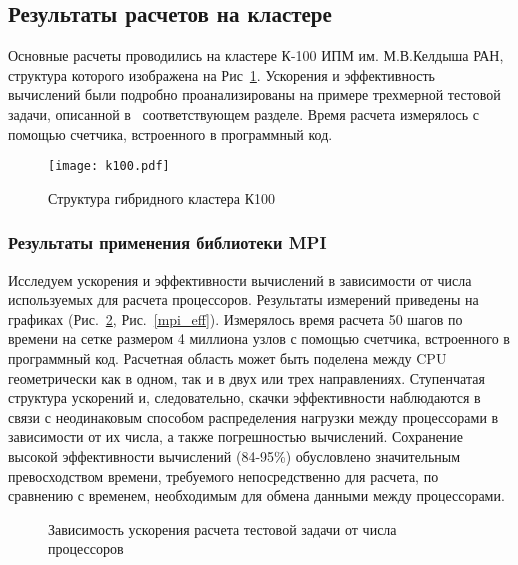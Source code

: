 \subsection{Результаты расчетов на кластере}

Основные расчеты проводились на кластере К-100 ИПМ им. М.В.Келдыша РАН, 
структура которого изображена на Рис~\ref{pic_k100}.
Ускорения и эффективность вычислений
были подробно проанализированы на примере трехмерной тестовой задачи, описанной в~ соответствующем
разделе. Время расчета измерялось с помощью счетчика, встроенного в программный код.

\begin{figure}[!h]\center
\texttt{[image: k100.pdf]} 
\caption{Структура гибридного кластера К100}
\label{pic_k100}
\end{figure}

\subsubsection{Результаты применения библиотеки MPI}

Исследуем ускорения и эффективности вычислений в зависимости от числа
используемых для расчета процессоров. Результаты измерений приведены
на графиках (Рис.~\ref{mpi_speedup}, Рис.~\ref{mpi_eff}).
Измерялось время расчета 50 шагов по времени на сетке размером 4 миллиона узлов
с помощью счетчика, встроенного в программный код.
Расчетная область может быть поделена между CPU геометрически как в одном, так и в двух или трех направлениях.
Ступенчатая структура ускорений и, следовательно, скачки эффективности наблюдаются
в связи с неодинаковым способом распределения нагрузки между процессорами
в зависимости от их числа, а также погрешностью вычислений. Сохранение высокой
эффективности вычислений (84-95\%) обусловлено значительным превосходством времени, требуемого
непосредственно для расчета, по~ сравнению с временем, необходимым для обмена данными
между процессорами.

\begin{figure}[!h]
\begin{center}
\caption{Зависимость ускорения расчета тестовой задачи от числа процессоров}
\label{mpi_speedup}
\end{center}
\end{figure}

